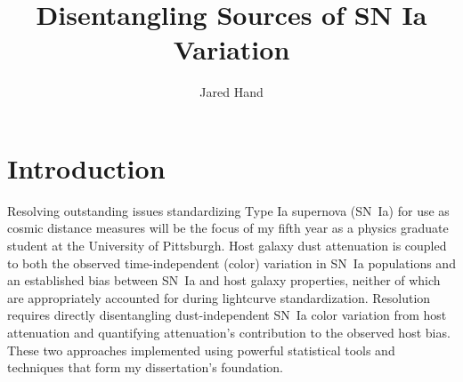 \documentclass[modern]{aastex63}
\begin{document}
\title{Disentangling Sources of SN Ia Variation}

\author{Jared Hand}

\section{Introduction}
Resolving outstanding issues standardizing Type Ia supernova (SN~Ia) for use as cosmic distance measures will be the focus of my fifth year as a physics graduate student at the University of Pittsburgh. Host galaxy dust attenuation is coupled to both the observed time-independent (color) variation in SN~Ia populations and an established bias between SN~Ia and host galaxy properties, neither of which are appropriately accounted for during lightcurve standardization. Resolution requires directly disentangling dust-independent SN~Ia color variation from host attenuation and quantifying attenuation's contribution to the observed host bias.  These two approaches implemented using powerful statistical tools and techniques that form my dissertation's foundation. 
\end{document}
